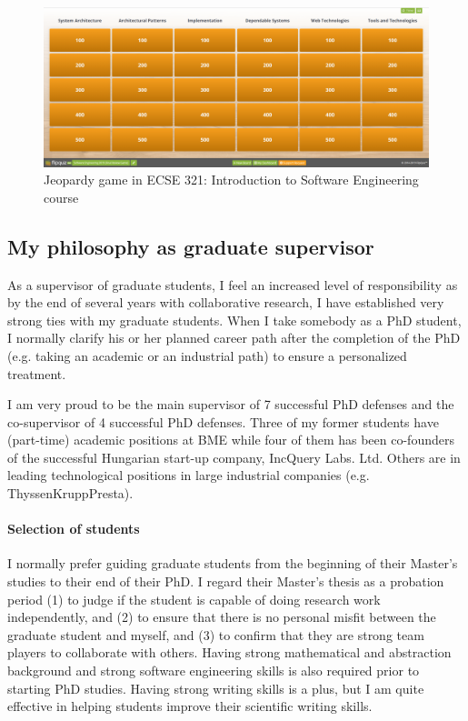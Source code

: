 \begin{figure}[htb]
\centering
\includegraphics[width=.8\textwidth]{figures/FlipQuiz}
\caption{Jeopardy game in ECSE 321: Introduction to Software Engineering course}
\label{fig:jeopardy-ecse321}
\end{figure}


\subsection{My philosophy as graduate supervisor}

As a supervisor of graduate students, I feel an increased level of responsibility as by the end of several years with collaborative research, I have established very strong ties with my graduate students. When I take somebody as a PhD student, I normally clarify his or her planned career path after the completion of the PhD (e.g. taking an academic or an industrial path) to ensure a personalized treatment. 

I am very proud to be the main supervisor of 7 successful PhD defenses and the co-supervisor of 4 successful PhD defenses. Three of my former students have (part-time) academic positions at BME while four of them has been co-founders of the successful Hungarian start-up company, IncQuery Labs. Ltd. Others are in leading technological positions in large industrial companies (e.g. ThyssenKruppPresta).

\paragraph{Selection of students}
I normally prefer guiding graduate students from the beginning of their Master's studies to their end of their PhD. I regard their Master's thesis as a probation period (1) to judge if the student is capable of doing research work independently, and (2) to ensure that there is no personal misfit between the graduate student and myself, and (3) to confirm that they are strong team players to collaborate with others. Having strong mathematical and abstraction background and strong software engineering skills is also required prior to starting PhD studies. Having strong writing skills is a plus, but I am quite effective in helping students improve their scientific writing skills. 

